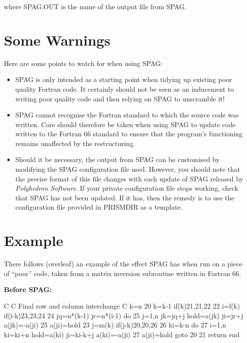 \documentclass[11pt,twoside,nolof]{starlink}
\begin{document}
where SPAG.OUT is the name of the output file from SPAG.


\section{Some Warnings}

Here are some points to watch for when using SPAG:

\begin {itemize}
\item SPAG is only intended as a starting point when tidying up existing poor
quality Fortran code.
It certainly should not be seen as an inducement to writing poor quality code
and then relying on SPAG to unscramble it!

\item SPAG cannot recognise the Fortran standard to which the source code was
written.
Care should therefore be taken when using SPAG to update code written to the
Fortran 66 standard to ensure that the program's functioning remains unaffected
by the restructuring.

\item Should it be necessary, the output from SPAG can be customised by
modifying the SPAG configuration file used.
However, you should note that the precise format of this file changes with each
update of SPAG released by \textit{Polyhedron Software}.
If your private configuration file stops working, check that SPAG has not been
updated.
If it has, then the remedy is to use the configuration file provided in
PRISMDIR as a template.
\end {itemize}

\section{Example}

There follows (overleaf) an example of the effect SPAG has when run on a
piece of ``poor'' code, taken from a matrix inversion
subroutine written in Fortran 66.

\twocolumn
\begin {center}
{\bf\large Before SPAG:}
\end {center}
\begin {terminalv}
C
C  Final row and column interchange
C
      k=n
   20 k=k-1
      if(k)21,21,22
22    i=l(k)
      if(i-k)23,23,24
24    jq=n*(k-1)
         jr=n*(i-1)
      do 25 j=1,n
      jk=jq+j
      hold=a(jk)
        ji=jr+j
      a(jk)=-a(ji)
   25 a(ji)=hold
23    j=m(k)
         if(j-k)20,20,26
 26   ki=k-n
       do 27 i=1,n
       ki=ki+n
       hold=a(ki)
      ji=ki-k+j
      a(ki)=-a(ji)
27     a(ji)=hold
      goto 20
 21   return
       end
\end{terminalv}
\pagebreak
\end{document}
